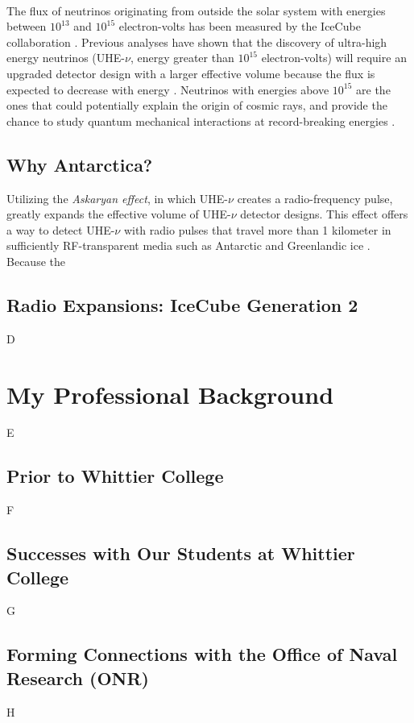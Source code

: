 \documentclass[../../../main.tex]{subfiles}
\begin{document}
\\
\vspace{0.25cm}
The flux of neutrinos originating from outside the solar system with energies between $10^{13}$ and $10^{15}$ electron-volts has been measured by the IceCube collaboration \cite{PhysRevLett.111.021103}. Previous analyses have shown that the discovery of ultra-high energy neutrinos (UHE-$\nu$, energy greater than $10^{15}$ electron-volts) will require an upgraded detector design with a larger effective volume because the flux is expected to decrease with energy \cite{PhysRevD.98.062003}. Neutrinos with energies above $10^{15}$ are the ones that could potentially explain the origin of cosmic rays, and provide the chance to study quantum mechanical interactions at record-breaking energies \cite{Astro2020_1} \cite{Astro2020_2}.

\subsection{Why Antarctica?}

Utilizing the \textit{Askaryan effect}, in which UHE-$\nu$ creates a radio-frequency pulse, greatly expands the effective volume of UHE-$\nu$ detector designs.  This effect offers a way to detect UHE-$\nu$ with radio pulses that travel more than 1 kilometer in sufficiently RF-transparent media such as Antarctic and Greenlandic ice \cite{10.3189/2015jog14j214} \cite{10.3189/2015jog15j057} \cite{10.1002/2015rs005849} \cite{10.1016/j.astropartphys.2011.11.010}.  Because the 

\subsection{Radio Expansions: IceCube Generation 2}
D
\section{My Professional Background}
E
\subsection{Prior to Whittier College}
F
\subsection{Successes with Our Students at Whittier College}
G
\subsection{Forming Connections with the Office of Naval Research (ONR)}
H
\end{document}
